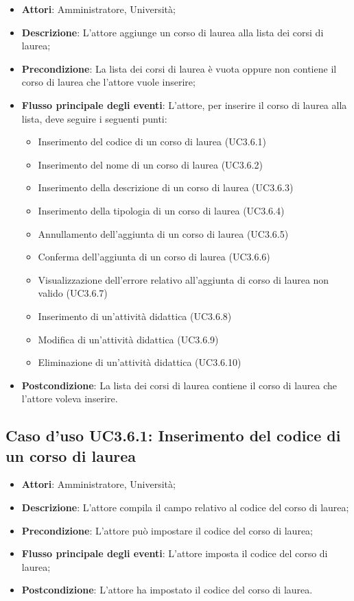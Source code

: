 \begin{itemize}
\item \textbf{Attori}: Amministratore, Università;
\item \textbf{Descrizione}: L'attore aggiunge un corso di laurea alla lista dei corsi di laurea;
\item \textbf{Precondizione}: La lista dei corsi di laurea è vuota oppure non contiene il corso di laurea che l'attore vuole inserire;
\item \textbf{Flusso principale degli eventi}: L'attore, per inserire il corso di laurea alla lista, deve seguire i seguenti punti:
\begin{itemize}
\item Inserimento del codice di un corso di laurea (UC3.6.1)
\item Inserimento del nome di un corso di laurea (UC3.6.2)
\item Inserimento della descrizione di un corso di laurea (UC3.6.3)
\item Inserimento della tipologia di un corso di laurea (UC3.6.4)
\item Annullamento dell'aggiunta di un corso di laurea (UC3.6.5)
\item Conferma dell’aggiunta di un corso di laurea (UC3.6.6)
\item Visualizzazione dell'errore relativo all’aggiunta di corso di laurea non valido  (UC3.6.7)
\item Inserimento di un'attività didattica (UC3.6.8)
\item Modifica di un'attività didattica (UC3.6.9)
\item Eliminazione di un'attività didattica (UC3.6.10)
\end{itemize}
\item \textbf{Postcondizione}: La lista dei corsi di laurea contiene il corso di laurea che l'attore voleva inserire.
\end{itemize}
\subsection{Caso d'uso \texorpdfstring{UC3.6.1}{UC3.6.1}: Inserimento del codice di un corso di laurea}
\begin{itemize}
\item \textbf{Attori}: Amministratore, Università;
\item \textbf{Descrizione}: L'attore compila il campo relativo al codice del corso di laurea;
\item \textbf{Precondizione}: L'attore può impostare il codice del corso di laurea;
\item \textbf{Flusso principale degli eventi}: L'attore imposta il codice del corso di laurea;
\item \textbf{Postcondizione}: L'attore ha impostato il codice del corso di laurea.
\end{itemize}
